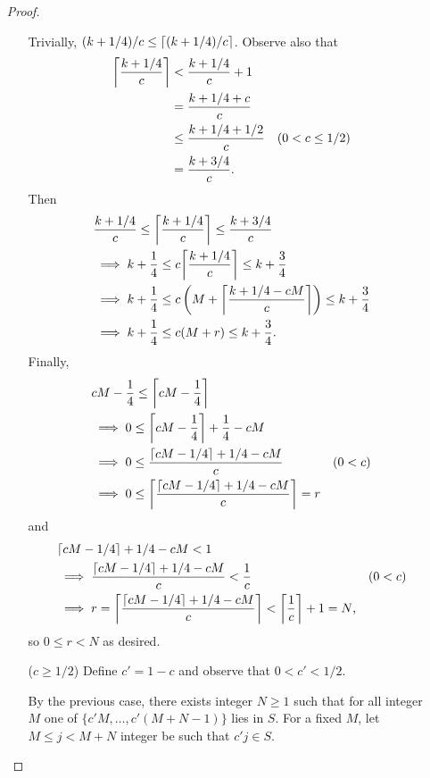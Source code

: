 \documentclass[oneside]{article}
\DeclarePairedDelimiter\ceil{\lceil}{\rceil}
\begin{document}
\begin{enumerate}[label=(\alph*)]
\begin{proof}
\begin{itemize}[leftmargin=45pt]
        Trivially, $(k + 1/4)/c \leq \ceil*{(k + 1/4)/c}$. Observe
        also that \begin{align*}
          \ceil*{\frac{k + 1/4}{c}}
          &< \frac{k + 1/4}{c} + 1 \\
          &= \frac{k + 1/4 + c}{c} \\
          &\leq \frac{k + 1/4 + 1/2}{c} & \text{($0 < c \leq 1/2$)} \\
          &= \frac{k + 3/4}{c} \text{.}
        \end{align*} Then
        \begin{align*}
          &\frac{k + 1/4}{c}
          \leq \ceil*{\frac{k + 1/4}{c}}
          \leq \frac{k + 3/4}{c} \\
          &\implies k + \frac14
          \leq c\ceil*{\frac{k + 1/4}{c}}
          \leq k + \frac34 \\
          &\implies k + \frac14
          \leq c\left(M+\ceil*{\frac{k + 1/4 - cM}{c}}\right)
          \leq k + \frac34 \\
          &\implies k + \frac14 \leq c(M+r) \leq k + \frac34 \text{.}
        \end{align*}
        Finally, \begin{align*}
          &cM - \frac14 \leq \ceil*{cM - \frac14} \\
          &\implies 0 \leq \ceil*{cM - \frac14} + \frac14 - cM \\
          &\implies 0 \leq \frac{\ceil{cM - 1/4} + 1/4 - cM}{c}
          & \text{($0 < c$)} \\
          &\implies 0 \leq \ceil*{\frac{\ceil{cM - 1/4} + 1/4 - cM}{c}} = r
        \end{align*} and \begin{align*}
          &\ceil{cM - 1/4} + 1/4 - cM < 1 \\
          &\implies \frac{\ceil{cM - 1/4} + 1/4 - cM}{c} < \frac1{c}
            &\text{($0 < c$)} \\
          &\implies r = \ceil*{\frac{\ceil{cM - 1/4} + 1/4 - cM}{c}}
          < \ceil*{\frac1c} + 1 = N \text{,}
        \end{align*} so $0 \leq r < N$ as desired.

        \item[($c \geq 1/2$)] Define $c' = 1 - c$ and observe that
        $0 < c' < 1/2$.

        By the previous case, there exists integer $N \geq 1$ such that for all
        integer $M$ one of $\{c'M, \dots, c'(M+N-1)\}$ lies in $S$. For a fixed
        $M$, let $M \leq j < M+N$ integer be such that $c'j \in S$.


\end{itemize}
\end{proof}
\end{enumerate}
\end{document}
